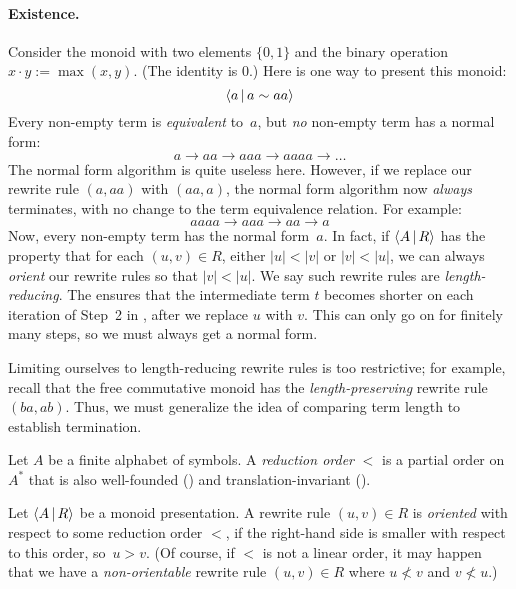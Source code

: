 \documentclass[../generics]{subfiles}
\begin{document}
\paragraph{Existence.} Consider the monoid with two elements $\{0,1\}$ and the binary operation $x\cdot y:=\max(x,y)$. (The identity is 0.) Here is one way to present this monoid:
\[ \langle a\,|\,a\sim aa\rangle \]
Every non-empty term is \emph{equivalent} to~$a$, but \emph{no} non-empty term has a normal form:
\[ a \rightarrow aa \rightarrow aaa \rightarrow aaaa \rightarrow \ldots \]
The normal form algorithm is quite useless here. However, if we replace our rewrite rule $(a, aa)$ with $(aa, a)$, the normal form algorithm now \emph{always} terminates, with no change to the term equivalence relation. For example:
\[ aaaa \rightarrow aaa \rightarrow aa \rightarrow a \]
Now, every non-empty term has the normal form~$a$. In fact, if $\langle A\,|\,R\rangle$ has the property that for each $(u,v)\in R$, either $|u|<|v|$ or $|v|<|u|$, we can always \emph{orient} our rewrite rules so that $|v|<|u|$. We say such rewrite rules are \emph{length-reducing}. The ensures that the intermediate term $t$ becomes shorter on each iteration of Step~2 in , after we replace $u$ with $v$. This can only go on for finitely many steps, so we must always get a normal form.

Limiting ourselves to length-reducing rewrite rules is too restrictive; for example, recall that the free commutative monoid has the \emph{length-preserving} rewrite rule $(ba, ab)$. Thus, we must generalize the idea of comparing term length to establish termination.

\begin{definition}\label{reduction order def}
Let $A$ be a finite alphabet of symbols. A \emph{reduction order} $<$ is a partial order on $A^*$ that is also well-founded () and translation-invariant ().
\end{definition}

\begin{definition}
Let $\langle A\,|\,R\rangle$ be a monoid presentation. A rewrite rule $(u,v)\in R$ is \emph{oriented} with respect to some reduction order $<$, if the right-hand side is smaller with respect to this order, so~$u>v$. (Of course, if $<$ is not a linear order, it may happen that we have a \emph{non-orientable} rewrite rule $(u,v)\in R$ where $u\not< v$ and $v\not< u$.)
\end{definition}
\end{document}
